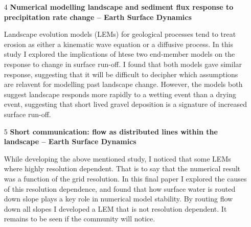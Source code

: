 \begin{itemize}
\item[4] {\bf  Numerical modelling landscape and sediment flux response to precipitation rate change -- Earth Surface Dynamics}

Landscape evolution models (LEMs) for geological processes tend to treat erosion as either a kinematic wave equation or a diffusive process. In this study I explored the implications of htese two end-member models on the response to change in surface run-off. I found that both models gave similar response, suggesting that it will be difficult to decipher which assumptions are relavent for modelling past landscape change. However, the models both suggest landscape responds more rapidly to a wetting event than a drying event, suggesting that short lived gravel deposition is a signature of increased surface run-off.

\item[5] {\bf Short communication: flow as distributed lines within the landscape -- Earth Surface Dynamics}

While developing the above mentioned study, I noticed that some LEMs where highly resolution dependent. That is to say that the numerical result was a function of the grid resolution. In this final paper I explored the causes of this resolution dependence, and found that how surface water is routed down slope plays a key role in numerical model stability. By routing flow down all slopes I developed a LEM that is not resolution dependent. It remains to be seen if the community will notice.

\end{itemize}
